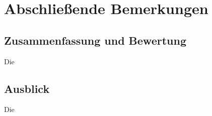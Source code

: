 \chapter{Abschließende Bemerkungen}

\section{Zusammenfassung und Bewertung}

Die 

\section{Ausblick}

Die